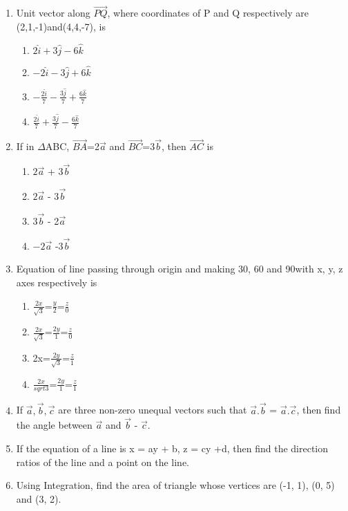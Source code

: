 \documentclass{article}
\begin{document}
\begin{enumerate}
\item Unit vector along $\overrightarrow{PQ}$, where coordinates of P and Q respectively are (2,1,-1)and(4,4,-7), is
\begin{enumerate}
\item $2\hat{i}+3\hat{j}-6\hat{k}$
\item $-2\hat{i}-3\hat{j}+6\hat{k}$
\item $-\frac{2\hat{i}}{7}-\frac{3\hat{j}}{7}+\frac{6\hat{k}}{7}$
\item $\frac{2\hat{i}}{7}+\frac{3\hat{j}}{7}-\frac{6\hat{k}}{7}$
\end{enumerate}

\item If in $\Delta$ABC, $\overrightarrow{BA}$=2$\overrightarrow{a}$ and $\overrightarrow{BC}$=3$\overrightarrow{b}$, then $\overrightarrow{AC}$ is
\begin{enumerate}
\item $2\overrightarrow{a}$ + 3$\overrightarrow{b}$
\item $2\overrightarrow{a}$ - 3$\overrightarrow{b}$
\item $3\overrightarrow{b}$ - 2$\overrightarrow{a}$
\item $-2\overrightarrow{a}$ -3$\overrightarrow{b}$
\end{enumerate}

\item Equation of line passing through origin and making 30\degree{}, 60\degree{} and 90\degree with x, y, z axes respectively is
\begin{enumerate}
\item $\frac{2x}{\sqrt{3}}$=$\frac{y}{2}$=$\frac{z}{0}$
\item $\frac{2x}{\sqrt{3}}$=$\frac{2y}{1}$=$\frac{z}{0}$
\item 2x=$\frac{2y}{\sqrt{3}}$=$\frac{z}{1}$
\item $\frac{2x}{sqrt{3}}$=$\frac{2y}{1}$=$\frac{z}{1}$
\end{enumerate}

\item If $\overrightarrow{a}, \overrightarrow{b}, \overrightarrow{c}$ are three non-zero unequal vectors such that $\overrightarrow{a}.\overrightarrow{b}$ = $\overrightarrow{a}.\overrightarrow{c}$, then find the angle between $\overrightarrow{a}$ and $\overrightarrow{b}$ - $\overrightarrow{c}$.

\item If the equation of a line is x = ay + b, z = cy +d, then find the direction ratios of the line and a point on the line.

\item Using Integration, find the area of triangle whose vertices are (-1, 1), (0, 5) and (3, 2).
\end{enumerate}
\end{document}
